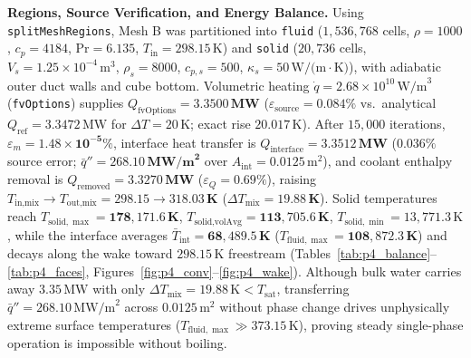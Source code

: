 \documentclass[10pt,a4paper]{article}
\begin{document}
\textbf{Regions, Source Verification, and Energy Balance.} Using \texttt{splitMeshRegions}, Mesh B was partitioned into \texttt{fluid} ($1{,}536{,}768$ cells, $\rho=1000$, $c_p=4184$, $\mathrm{Pr}=6.135$, $T_{\text{in}}=298.15\,\text{K}$) and \texttt{solid} ($20{,}736$ cells, $V_s = 1.25\times 10^{-4}\,\text{m}^3$, $\rho_s=8000$, $c_{p,s}=500$, $\kappa_s=50\,\text{W/(m}\cdot\text{K)}$), with adiabatic outer duct walls and cube bottom. Volumetric heating $\dot{q} = 2.68\times 10^{10}\,\text{W/m}^3$ (\texttt{fvOptions}) supplies $Q_{\text{fvOptions}} = \mathbf{3.3500\,\text{MW}}$ ($\varepsilon_{\text{source}} = 0.084\%$ vs.\ analytical $Q_{\text{ref}} = 3.3472\,\text{MW}$ for $\Delta T = 20\,\text{K}$; exact rise $20.017\,\text{K}$). After $15{,}000$ iterations, $\varepsilon_m = \mathbf{1.48\times 10^{-5}\%}$, interface heat transfer is $Q_{\text{interface}} = \mathbf{3.3512\,\text{MW}}$ ($0.036\%$ source error; $\bar{q}'' = \mathbf{268.10\,\text{MW/m}^2}$ over $A_{\text{int}} = 0.0125\,\text{m}^2$), and coolant enthalpy removal is $Q_{\text{removed}} = \mathbf{3.3270\,\text{MW}}$ ($\varepsilon_Q = \mathbf{0.69\%}$), raising $T_{\text{in,mix}} \to T_{\text{out,mix}} = 298.15 \to \mathbf{318.03\,\text{K}}$ ($\Delta T_{\text{mix}} = \mathbf{19.88\,\text{K}}$). Solid temperatures reach $T_{\text{solid},\max} = \mathbf{178{,}171.6\,\text{K}}$, $T_{\text{solid,volAvg}} = \mathbf{113{,}705.6\,\text{K}}$, $T_{\text{solid},\min} = 13{,}771.3\,\text{K}$, while the interface averages $\bar{T}_{\text{int}} = \mathbf{68{,}489.5\,\text{K}}$ ($T_{\text{fluid},\max} = \mathbf{108{,}872.3\,\text{K}}$) and decays along the wake toward $298.15\,\text{K}$ freestream (Tables~\ref{tab:p4_balance}--\ref{tab:p4_faces}, Figures~\ref{fig:p4_conv}--\ref{fig:p4_wake}). Although bulk water carries away $3.35\,\text{MW}$ with only $\Delta T_{\text{mix}} = 19.88\,\text{K} < T_{\text{sat}}$, transferring $\bar{q}'' = 268.10\,\text{MW/m}^2$ across $0.0125\,\text{m}^2$ without phase change drives unphysically extreme surface temperatures ($T_{\text{fluid},\max} \gg 373.15\,\text{K}$), proving steady single-phase operation is impossible without boiling.
\end{document}
